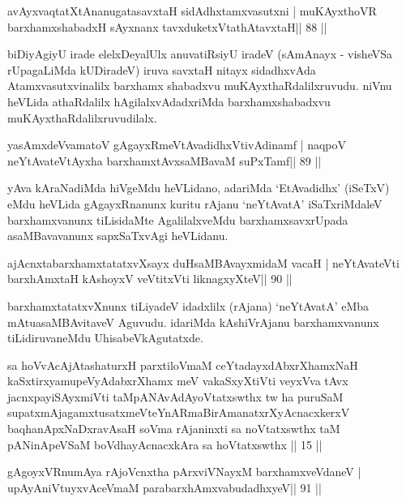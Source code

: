 \begin{shl}
avAyxvaqtatXtAnanugatasavxtaH sidAdhxtamxvasutxni |
muKAyxthoVR barxhamxshabadxH sAyxnanx tavxduketxV\s tathAtavxtaH\hfill || 88 ||
\end{shl}

\begin{artha}
biDiyAgiyU irade elelxDeyalUlx anuvatiRsiyU iradeV (sAmAnayx - visheVSa rUpagaLiMda kUDiradeV) iruva savxtaH nitayx sidadhxvAda Atamxvasutxvinalilx barxhamx shabadxvu muKAyxthaRdalilxruvudu. niVnu heVLida athaRdalilx hAgilalxvAdadxriMda barxhamxshabadxvu muKAyxthaRdalilxruvudilalx.
\end{artha} 




\begin{shl}
yasAmxdeVvamatoV gAgayxRmeVtAvadidhxVtivAdinamf |
naqpoV neYtAvateVtAyxha barxhamxtAvxsaMBavaM suPxTamf\hfill || 89 ||
\end{shl}

\begin{artha}
yAva kAraNadiMda hiVgeMdu heVLidano, adariMda `EtAvadidhx' (iSeTxV) eMdu heVLida gAgayxRnanunx kuritu rAjanu `neYtAvatA' iSaTxriMdaleV barxhamxvanunx tiLisidaMte AgalilalxveMdu barxhamxsavxrUpada asaMBavavanunx sapxSaTxvAgi heVLidanu.
\end{artha}


\begin{shl}
ajAcnxtabarxhamxtatatxvXsayx duHsaMBAvayxmidaM vacaH |
neYtAvateVti barxhAmxtaH kAshoyxV veVtitxVti liknagxyXteV\hfill || 90 ||
\end{shl}

\begin{artha}
barxhamxtatatxvXnunx tiLiyadeV idadxlilx (rAjana) `neYtAvatA' eMba mAtu\break asaMBAvitaveV Aguvudu. idariMda kAshiVrAjanu barxhamxvanunx tiLidiruvaneMdu UhisabeVkAgutatxde.
\end{artha}


\begin{kandikeshl}
sa hoVvAcAjAtashaturxH parxtiloVmaM ceYtadayxdAbxrXhamxNaH kaSxtirxyamupeVyAdabxrXhamx meV vakaSxyXtiVti veyxVva tAvx jacnxpayiSAyxmiVti taM\break pANAvAdAyoVtatxswthx tw ha puruSaM supatxmAjagamxtusatxmeVteYnARmaBirAmanatxrXyAcnacxkerxV baqhanApxNaDxravAsaH soVma rAjaninxti sa noVtatxswthx taM pANinApeVSaM boVdhayAcnacxkAra sa hoVtatxswthx || 15 ||
\end{kandikeshl}
\vskip 2pt
\begin{shl}
gAgoyxVR\s numAya rAjoVcnx\s tha pArxviVNayxM barxhamxveVdaneV |
upAyAniVtuyxvAceVmaM parabarxhAmxvabudadhxyeV\hfill || 91 ||
\end{shl}

